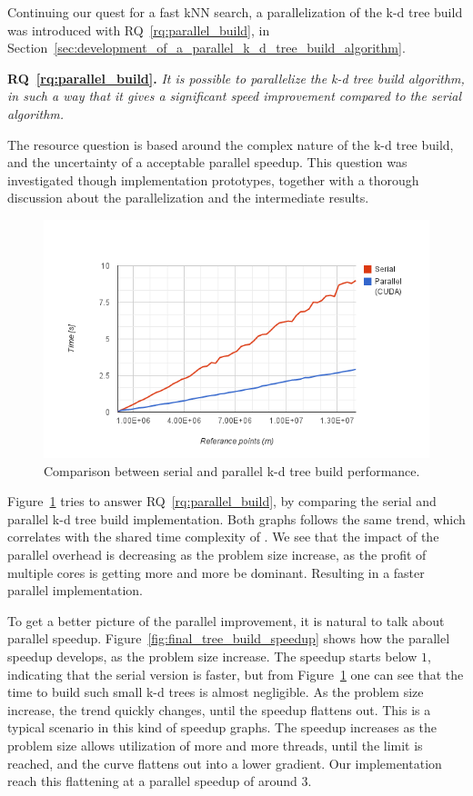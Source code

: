 
Continuing our quest for a fast kNN search, a parallelization of the k-d tree build was introduced with RQ~\ref{rq:parallel_build}, in Section~\ref{sec:development_of_a_parallel_k_d_tree_build_algorithm}.

\textbf{RQ~\ref{rq:parallel_build}.} \emph{It is possible to parallelize the k-d tree build algorithm, in such a way that it gives a significant speed improvement compared to the serial algorithm.}

The resource question is based around the complex nature of the k-d tree build, and the uncertainty of a acceptable parallel speedup. This question was investigated though implementation prototypes, together with a thorough discussion about the parallelization and the intermediate results. 



\begin{figure}[ht!]
    \centering
    \includegraphics[width=120mm]{../gfx/final_tree_build.png}
    \caption{Comparison between serial and parallel k-d tree build performance.}
    \label{fig:final_tree_build}
\end{figure}

Figure~\ref{fig:final_tree_build} tries to answer RQ~\ref{rq:parallel_build}, by comparing the serial and parallel k-d tree build implementation. Both graphs follows the same trend, which correlates with the shared time complexity of . We see that the impact of the parallel overhead is decreasing as the problem size increase, as the profit of multiple cores is getting more and more be dominant. Resulting in a faster parallel implementation.

To get a better picture of the parallel improvement, it is natural to talk about parallel speedup. Figure~\ref{fig:final_tree_build_speedup} shows how the parallel speedup develops, as the problem size increase. The speedup starts below $1$, indicating that the serial version is faster, but from Figure~\ref{fig:final_tree_build} one can see that the time to build such small k-d trees is almost negligible. As the problem size increase, the trend quickly changes, until the speedup flattens out. This is a typical scenario in this kind of speedup graphs. The speedup increases as the problem size allows utilization of more and more threads, until the limit is reached, and the curve flattens out into a lower gradient. Our implementation reach this flattening at a parallel speedup of around $3$.      

